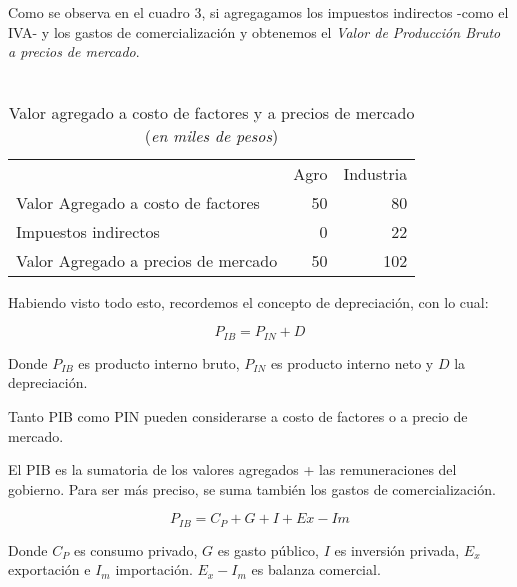Como se observa en el cuadro 3,
si agregagamos los impuestos indirectos -como el IVA- 
y los gastos de comercialización
y obtenemos el \textit{Valor de Producción Bruto a precios de mercado}.

\vspace{.5cm}
\begin{table}[H]
    \centering
    \caption{\\Valor agregado a costo de factores y a precios de mercado\\
        (\textit{en miles de pesos})}
    \vspace{.5cm}
    \begin{tabular}{lrr}
        \hline
                                            & Agro & Industria \\
        Valor Agregado a costo de factores  & 50   & 80        \\
        Impuestos indirectos                & 0    & 22        \\
        \hline
        Valor Agregado a precios de mercado & 50   & 102       \\
    \end{tabular}
\end{table}
\vspace{.5cm}

Habiendo visto todo esto,
recordemos el concepto de depreciación,
con lo cual:

\begin{equation*}
    P_{IB} = P_{IN} + D
\end{equation*}

Donde \(P_{IB}\) es producto interno bruto,
\(P_{IN}\) es producto interno neto y 
\(D\) la depreciación.

Tanto PIB como PIN pueden considerarse a costo de factores o a precio de mercado.

El PIB es la sumatoria de los valores agregados + las remuneraciones del 
gobierno. 
Para ser más preciso, se suma también los gastos de comercialización.

\begin{equation*}
    P_{IB} = C_P + G + I + Ex - Im
\end{equation*}

Donde \(C_P\) es consumo privado,
\(G\) es gasto público,
\(I\) es inversión privada,
\(E_x\) exportación
e \(I_m\) importación.
\(E_x - I_m\) es balanza comercial.